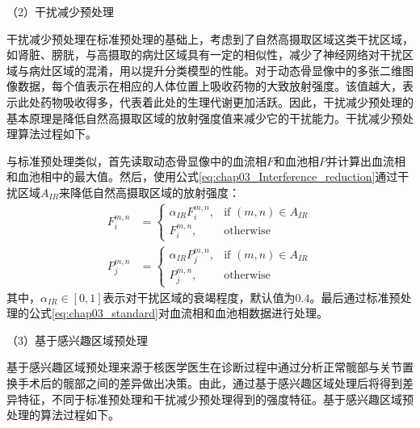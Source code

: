 （2）干扰减少预处理

干扰减少预处理在标准预处理的基础上，考虑到了自然高摄取区域这类干扰区域，如肾脏、膀胱，与高摄取的病灶区域具有一定的相似性，减少了神经网络对干扰区域与病灶区域的混淆，用以提升分类模型的性能。对于动态骨显像中的多张二维图像数据，每个值表示在相应的人体位置上吸收药物的大致放射强度。该值越大，表示此处药物吸收得多，代表着此处的生理代谢更加活跃。因此，干扰减少预处理的基本原理是降低自然高摄取区域的放射强度值来减少它的干扰能力。干扰减少预处理算法过程如下。

与标准预处理类似，首先读取动态骨显像中的血流相\(F\)和血池相\(P\)并计算出血流相和血池相中的最大值。然后，使用公式\ref{eq:chap03_Interference_reduction}通过干扰区域\(A_{IR}\)来降低自然高摄取区域的放射强度：
\begin{equation}
  \begin{aligned}
    F_i^{m, n} & =
    \begin{cases}
      \alpha_{IR}F_i^{m, n}, & \text{if \((m,n) \in A_{IR}\)} \\
      F_i^{m, n},            & \text{otherwise}
    \end{cases} \\
    P_j^{m, n} & =
    \begin{cases}
      \alpha_{IR}P_j^{m, n}, & \text{if \((m,n) \in A_{IR}\)} \\
      P_j^{m, n},            & \text{otherwise}
    \end{cases}
  \end{aligned}
  \label{eq:chap03_Interference_reduction}
\end{equation}
其中，\(\alpha_{IR} \in [0, 1]\)表示对干扰区域的衰竭程度，默认值为\(0.4\)。最后通过标准预处理的公式\ref{eq:chap03_standard}对血流相和血池相数据进行处理。

（3）基于感兴趣区域预处理

基于感兴趣区域预处理来源于核医学医生在诊断过程中通过分析正常髋部与关节置换手术后的髋部之间的差异做出决策。由此，通过基于感兴趣区域处理后将得到差异特征，不同于标准预处理和干扰减少预处理得到的强度特征。基于感兴趣区域预处理的算法过程如下。

